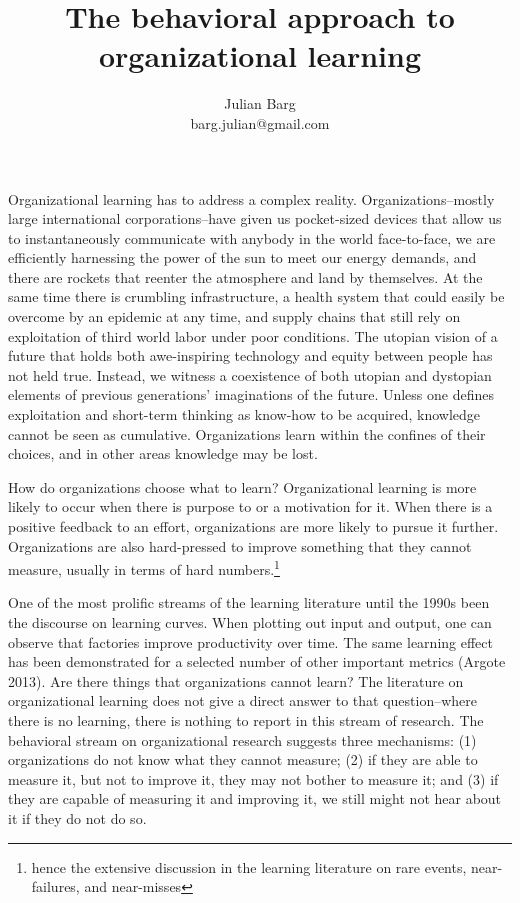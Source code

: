 \documentclass[12pt, man, natbib]{apa6}
\title{The behavioral approach to organizational learning}
\author{Julian Barg\\barg.julian@gmail.com}
\affiliation{Ivey Business School}
\begin{document}
	
	\maketitle
	
	\singlespacing
	
	\section{}	
	Organizational learning has to address a complex reality. Organizations--mostly large international corporations--have given us pocket-sized devices that allow us to instantaneously communicate with anybody in the world face-to-face, we are efficiently harnessing the power of the sun to meet our energy demands, and there are rockets that reenter the atmosphere and land by themselves. At the same time there is crumbling infrastructure, a health system that could easily be overcome by an epidemic at any time, and supply chains that still rely on exploitation of third world labor under poor conditions. The utopian vision of a future that holds both awe-inspiring technology and equity between people has not held true. Instead, we witness a coexistence of both utopian and dystopian elements of previous generations' imaginations of the future. Unless one defines exploitation and short-term thinking as know-how to be acquired, knowledge cannot be seen as cumulative. Organizations learn within the confines of their choices, and in other areas knowledge may be lost.
	
	How do organizations choose what to learn? Organizational learning is more likely to occur when there is purpose to or a motivation for it. When there is a positive feedback to an effort, organizations are more likely to pursue it further. Organizations are also hard-pressed to improve something that they cannot measure, usually in terms of hard numbers.\footnote{hence the extensive discussion in the learning literature on rare events, near-failures, and near-misses}
	
	One of the most prolific streams of the learning literature until the 1990s been the discourse on learning curves. When plotting out input and output, one can observe that factories improve productivity over time. The same learning effect has been demonstrated for a selected number of other important metrics (Argote 2013). Are there things that organizations cannot learn? The literature on organizational learning does not give a direct answer to that question--where there is no learning, there is nothing to report in this stream of research. The behavioral stream on organizational research suggests three mechanisms: (1) organizations do not know what they cannot measure; (2) if they are able to measure it, but not to improve it, they may not bother to measure it; and (3) if they are capable of measuring it and improving it, we still might not hear about it if they do not do so.
	
\end{document}
